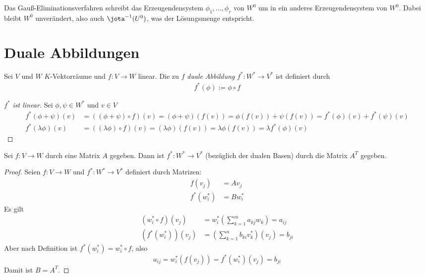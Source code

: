 \documentclass{mycourse}
\begin{document}
Das Gauß-Eliminationsverfahren schreibt das Erzeugendensystem $\phi_1,\dotsc,\phi_r$ von $W^0$ um in ein
anderes Erzeugendensystem von $W^0$.
Dabei bleibt $W^0$ unverändert, also auch $\jota^{-1}(U^0)$, was der Lösungsmenge entspricht.

\section{Duale Abbildungen}

\begin{df}
\label{df:9.10}
Sei $V$ und $W$ $K$-Vektorräume und $f:V\to W$ linear.
Die zu $f$ \emph{duale Abbildung} $f^*:W^*\to V^*$ ist definiert durch
\begin{align*}
	\boxed {f^*(\phi):=\phi\circ f}
\end{align*}
\end{df}

\begin{center}
      \end{center}


\begin{proof}[$f^*$ ist linear]
Sei $\phi,\psi\in W^*$ und $v\in V$
\begin{align*}
f^*(\phi+\psi)(v) &= ((\phi+\psi)\circ f)(v) = (\phi+\psi)(f(v))=\phi(f(v))+\psi(f(v))=f^*(\phi)(v)+f^*(\psi)(v)\\
f^*(\lambda\phi)(v)&= ((\lambda\phi)\circ f)(v)=(\lambda\phi)(f(v))=\lambda\phi(f(v))=\lambda f^*(\phi)(v)
\end{align*}
\end{proof}

\begin{prop}
\label{prop:9.11}
Sei $f:V\to W$ durch eine Matrix $A$ gegeben.
Dann ist $f^*:W^*\to V^*$ (bezüglich der dualen Basen) durch die Matrix $A^T$ gegeben.
\begin{proof}
Seien $f:V\to W$ und $f^*:W^*\to V^*$ definiert durch Matrizen:
\begin{align*}
f(v_j)&=Av_j\\
f^*(w_i^*)&=Bw_i^*
\end{align*}
Es gilt
\begin{align*}
	(w_i^*\circ f)(v_j)&=w_i^*\left(\sum_{k=1}^m a_{kj}w_k\right)=a_{ij}\\
  (f^*(w_i^*))(v_j) &=\left(\sum_{k=1}^n b_{ki}v_k^*\right)(v_j)=b_{ji}
\end{align*}
Aber nach Definition ist $f^*(w_i^*)=w_i^*\circ f$, also 
\[
	a_{ij}=w_i^*(f(v_j))=f^*(w_i^*)(v_j)=b_{ji}
\]
Damit ist $B=A^T$.
\end{proof}
\end{prop}
\end{document}
